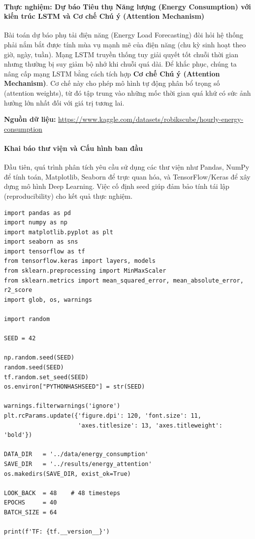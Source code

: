 \paragraph{Thực nghiệm: Dự báo Tiêu thụ Năng lượng (Energy Consumption) với kiến trúc LSTM và Cơ chế Chú ý (Attention Mechanism)} \hfill\mbox{}

Bài toán dự báo phụ tải điện năng (Energy Load Forecasting) đòi hỏi hệ thống phải nắm bắt được tính mùa vụ mạnh mẽ của điện năng (chu kỳ sinh hoạt theo giờ, ngày, tuần). Mạng LSTM truyền thống tuy giải quyết tốt chuỗi thời gian nhưng thường bị suy giảm bộ nhớ khi chuỗi quá dài. Để khắc phục, chúng ta nâng cấp mạng LSTM bằng cách tích hợp \textbf{Cơ chế Chú ý (Attention Mechanism)}. Cơ chế này cho phép mô hình tự động phân bổ trọng số (attention weights), từ đó tập trung vào những mốc thời gian quá khứ có sức ảnh hưởng lớn nhất đối với giá trị tương lai.

\begin{center}
    \textbf{Nguồn dữ liệu:} \url{https://www.kaggle.com/datasets/robikscube/hourly-energy-consumption}
\end{center}

\paragraph{Khai báo thư viện và Cấu hình ban đầu} \hfill\mbox{}

Đầu tiên, quá trình phân tích yêu cầu sử dụng các thư viện như Pandas, NumPy để tính toán, Matplotlib, Seaborn để trực quan hóa, và TensorFlow/Keras để xây dựng mô hình Deep Learning. Việc cố định seed giúp đảm bảo tính tái lập (reproducibility) cho kết quả thực nghiệm.

\begin{lstlisting}[style=pythoncode, caption={Khai báo thư viện và thiết lập môi trường}]
import pandas as pd
import numpy as np
import matplotlib.pyplot as plt
import seaborn as sns
import tensorflow as tf
from tensorflow.keras import layers, models
from sklearn.preprocessing import MinMaxScaler
from sklearn.metrics import mean_squared_error, mean_absolute_error, r2_score
import glob, os, warnings

import random

SEED = 42

np.random.seed(SEED)
random.seed(SEED)
tf.random.set_seed(SEED)
os.environ["PYTHONHASHSEED"] = str(SEED)

warnings.filterwarnings('ignore')
plt.rcParams.update({'figure.dpi': 120, 'font.size': 11,
                     'axes.titlesize': 13, 'axes.titleweight': 'bold'})

DATA_DIR   = '../data/energy_consumption'
SAVE_DIR   = '../results/energy_attention'
os.makedirs(SAVE_DIR, exist_ok=True)

LOOK_BACK  = 48    # 48 timesteps
EPOCHS     = 40
BATCH_SIZE = 64

print(f'TF: {tf.__version__}')
\end{lstlisting}

